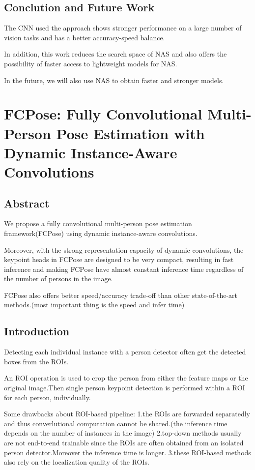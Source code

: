 \documentclass[11pt]{article}
\begin{document}
\subsection{Conclution and Future Work}

The CNN used the approach shows stronger performance on a large number of vision tasks and has a better accuracy-speed balance.

In addition, this work reduces the search space of NAS and also offers the possibility of faster access to lightweight models for NAS.

In the future, we will also use NAS to obtain faster and stronger models.
\section{FCPose: Fully Convolutional Multi-Person Pose Estimation with Dynamic Instance-Aware Convolutions}
\subsection{Abstract}
We propose a fully convolutional multi-person pose estimation framework(FCPose) using dynamic instance-aware convolutions.

Moreover, with the strong representation capacity of dynamic convolutions, the keypoint heads in FCPose are designed to be very compact, resulting in fast inference and making FCPose have almost constant inference time regardless of the number of persons in the image.

FCPose also offers better speed/accuracy trade-off than other state-of-the-art methods.(most important thing is the speed and infer time)

\subsection{Introduction}
Detecting each individual instance with a person detector often get the detected boxes from the ROIs.

An ROI operation is used to crop the person from either the feature maps or the original image.Then single person keypoint detection is performed within a ROI for each person, individually.

Some drawbacks about ROI-based pipeline:
\noindent1.the ROIs are forwarded separatedly and thus converlutional computation cannot be shared.(the inference time depends on the number of instances in the image)
\noindent2.top-down methods usually are not end-to-end trainable since the ROIs are often obtained from an isolated person detector.Moreover the inference time is longer.
\noindent3.these ROI-based methods also rely on the localization quality of the ROIs.
\end{document}
